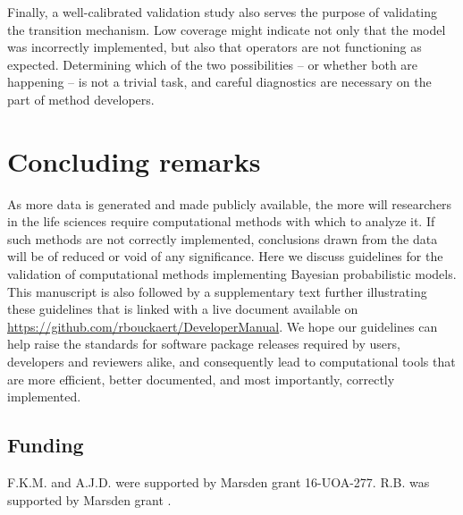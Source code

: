 \documentclass[oneside]{article}
\begin{document}
Finally, a well-calibrated validation study also serves the purpose of
validating the transition mechanism.
Low coverage might indicate not only that the model was incorrectly
implemented, but also that operators are not functioning as expected.
Determining which of the two possibilities -- or whether both are
happening -- is not a trivial task, and careful diagnostics are
necessary on the part of method developers.

\section*{Concluding remarks}

As more data is generated and made publicly available, the more will
researchers in the life sciences require computational methods with
which to analyze it.
If such methods are not correctly implemented, conclusions drawn from
the data will be of reduced or void of any significance.
Here we discuss guidelines for the validation of computational methods
implementing Bayesian probabilistic models.
This manuscript is also followed by a supplementary text further
illustrating these guidelines that is linked with a live document
available on \href{https://github.com/rbouckaert/DeveloperManual}{https://github.com/rbouckaert/DeveloperManual}.
We hope our guidelines can help raise the standards for software
package releases required by users, developers and reviewers alike,
and consequently lead to computational tools that are more efficient,
better documented, and most importantly, correctly implemented.

\subsection*{Funding}
F.K.M. and A.J.D. were supported by Marsden grant 16-UOA-277. R.B. was
supported by Marsden grant .






\end{document}

